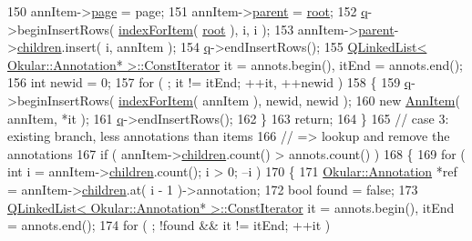 \begin{DoxyCode}
150         annItem->\hyperlink{structAnnItem_ad2bc09dd1499fd52205eb02c3bf67830}{page} = page;
151         annItem->\hyperlink{structAnnItem_aece74b70cc6acc8ebb751256386f9be8}{parent} = \hyperlink{classAnnotationModelPrivate_a35aef72ee0aebe05b6e0fa2c50c19f75}{root};
152         \hyperlink{classAnnotationModelPrivate_a106e8bd7ef602e10239b11d4a775647d}{q}->beginInsertRows( \hyperlink{classAnnotationModelPrivate_a49c3cbd8328e431324be4fff9ac25926}{indexForItem}( \hyperlink{classAnnotationModelPrivate_a35aef72ee0aebe05b6e0fa2c50c19f75}{root} ), i, i );
153         annItem->\hyperlink{structAnnItem_aece74b70cc6acc8ebb751256386f9be8}{parent}->\hyperlink{structAnnItem_a11048051ad0be5a2c8607a9334e006a1}{children}.insert( i, annItem );
154         \hyperlink{classAnnotationModelPrivate_a106e8bd7ef602e10239b11d4a775647d}{q}->endInsertRows();
155         \hyperlink{classQLinkedList}{QLinkedList< Okular::Annotation* >::ConstIterator} 
      it = annots.begin(), itEnd = annots.end();
156         \textcolor{keywordtype}{int} newid = 0;
157         \textcolor{keywordflow}{for} ( ; it != itEnd; ++it, ++newid )
158         \{
159             \hyperlink{classAnnotationModelPrivate_a106e8bd7ef602e10239b11d4a775647d}{q}->beginInsertRows( \hyperlink{classAnnotationModelPrivate_a49c3cbd8328e431324be4fff9ac25926}{indexForItem}( annItem ), newid, newid );
160             \textcolor{keyword}{new} \hyperlink{structAnnItem}{AnnItem}( annItem, *it );
161             \hyperlink{classAnnotationModelPrivate_a106e8bd7ef602e10239b11d4a775647d}{q}->endInsertRows();
162         \}
163         \textcolor{keywordflow}{return};
164     \}
165     \textcolor{comment}{// case 3: existing branch, less annotations than items}
166     \textcolor{comment}{//         => lookup and remove the annotations}
167     \textcolor{keywordflow}{if} ( annItem->\hyperlink{structAnnItem_a11048051ad0be5a2c8607a9334e006a1}{children}.count() > annots.count() )
168     \{
169         \textcolor{keywordflow}{for} ( \textcolor{keywordtype}{int} i = annItem->\hyperlink{structAnnItem_a11048051ad0be5a2c8607a9334e006a1}{children}.count(); i > 0; --i )
170         \{
171             \hyperlink{classOkular_1_1Annotation}{Okular::Annotation} *ref = annItem->\hyperlink{structAnnItem_a11048051ad0be5a2c8607a9334e006a1}{children}.at( i - 1 )->annotation;
172             \textcolor{keywordtype}{bool} found = \textcolor{keyword}{false};
173             \hyperlink{classQLinkedList}{QLinkedList< Okular::Annotation* >::ConstIterator}
       it = annots.begin(), itEnd = annots.end();
174             \textcolor{keywordflow}{for} ( ; !found && it != itEnd; ++it )

\end{DoxyCode}

